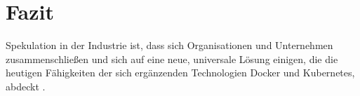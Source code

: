\documentclass[../main.tex]{subfiles}
\begin{document}
\chapter{Fazit}
\label{result}

  Spekulation in der Industrie ist, dass sich Organisationen und Unternehmen zusammenschließen und sich auf eine neue, universale Lösung einigen, die die heutigen Fähigkeiten der sich ergänzenden Technologien Docker und Kubernetes, abdeckt \cite[S.4]{dockerLXCKub}.




\end{document}
